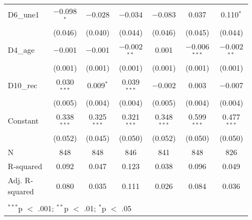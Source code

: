 \documentclass[
]{article}
\begin{document}
\begin{table}[!htbp]
\begin{tabular}{@{\extracolsep{5pt}}lcccccc}
  D6\_une1 & $-$0.098$^{*}$ & $-$0.028 & $-$0.034 & $-$0.083 & 0.037 & 0.110$^{*}$ \\ 
  & (0.046) & (0.040) & (0.044) & (0.046) & (0.045) & (0.044) \\ 
  D4\_age & $-$0.001 & $-$0.001 & $-$0.002$^{**}$ & 0.001 & $-$0.006$^{***}$ & $-$0.002$^{**}$ \\ 
  & (0.001) & (0.001) & (0.001) & (0.001) & (0.001) & (0.001) \\ 
  D10\_rec & 0.030$^{***}$ & 0.009$^{*}$ & 0.039$^{***}$ & $-$0.002 & 0.003 & $-$0.007 \\ 
  & (0.005) & (0.004) & (0.004) & (0.005) & (0.004) & (0.004) \\ 
  Constant & 0.338$^{***}$ & 0.325$^{***}$ & 0.321$^{***}$ & 0.348$^{***}$ & 0.599$^{***}$ & 0.477$^{***}$ \\ 
  & (0.052) & (0.045) & (0.050) & (0.052) & (0.050) & (0.050) \\ 
 N & 848 & 848 & 846 & 841 & 848 & 826 \\ 
R-squared & 0.092 & 0.047 & 0.123 & 0.038 & 0.096 & 0.049 \\ 
Adj. R-squared & 0.080 & 0.035 & 0.111 & 0.026 & 0.084 & 0.036 \\ 
\hline \\[-1.8ex] 
\multicolumn{7}{l}{$^{***}$p $<$ .001; $^{**}$p $<$ .01; $^{*}$p $<$ .05} \\ 
\end{tabular} 
\end{table}
\end{document}
